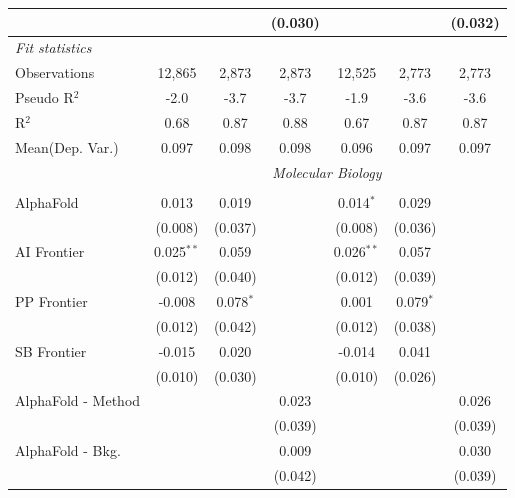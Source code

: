 \begin{tabular}{lcccccc}
                        &               &             & (0.030)       &               &             & (0.032)\\   
   \midrule
   \emph{Fit statistics}\\
   Observations         & 12,865        & 2,873       & 2,873         & 12,525        & 2,773       & 2,773\\  
   Pseudo R$^2$         & -2.0          & -3.7        & -3.7          & -1.9          & -3.6        & -3.6\\  
   R$^2$                & 0.68          & 0.87        & 0.88          & 0.67          & 0.87        & 0.87\\  
Mean(Dep. Var.) & 0.097 & 0.098 & 0.098 & 0.096 & 0.097 & 0.097 \\
   
 & \multicolumn{6}{c}{\textit{Molecular Biology}} \\ \\
   AlphaFold            & 0.013        & 0.019       &           & 0.014$^{*}$  & 0.029       &   \\   
                        & (0.008)      & (0.037)     &           & (0.008)      & (0.036)     &   \\   
   AI Frontier          & 0.025$^{**}$ & 0.059       &           & 0.026$^{**}$ & 0.057       &   \\   
                        & (0.012)      & (0.040)     &           & (0.012)      & (0.039)     &   \\   
   PP Frontier          & -0.008       & 0.078$^{*}$ &           & 0.001        & 0.079$^{*}$ &   \\   
                        & (0.012)      & (0.042)     &           & (0.012)      & (0.038)     &   \\   
   SB Frontier          & -0.015       & 0.020       &           & -0.014       & 0.041       &   \\   
                        & (0.010)      & (0.030)     &           & (0.010)      & (0.026)     &   \\   
   AlphaFold - Method   &              &             & 0.023     &              &             & 0.026\\   
                        &              &             & (0.039)   &              &             & (0.039)\\   
   AlphaFold - Bkg.     &              &             & 0.009     &              &             & 0.030\\   
                        &              &             & (0.042)   &              &             & (0.039)\\   

\end{tabular}
